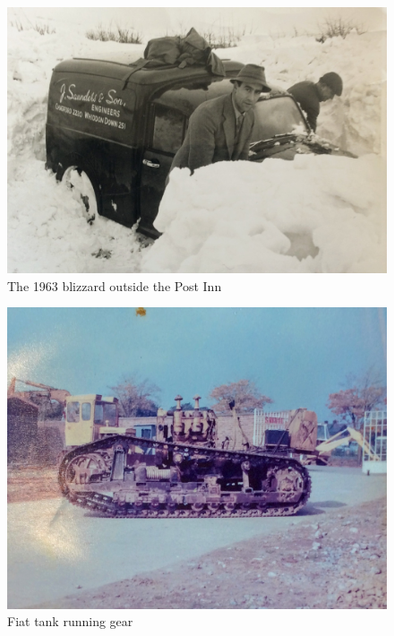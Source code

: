 
\begin{figure}
  \centering
  \includegraphics[width=.9\linewidth]{pictures/cropped/1963 blizzard outside the Post Inn.jpg}
  \caption*{The 1963 blizzard outside the Post Inn}
\end{figure}

\begin{figure}
  \centering
  \includegraphics[width=.9\linewidth]{pictures/cropped/Fiat tank running gear.jpg}
  \caption*{Fiat tank running gear}
\end{figure}

